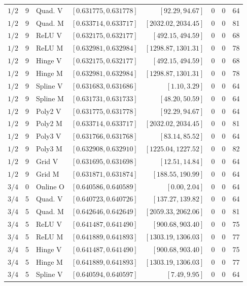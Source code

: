\begin{longtable}{rrlrrrrr}
$1/2$ & 9 & Quad. V & $[0.631775,0.631778]$ & $[92.29,94.67]$ & 0 & 0 & 64\\
$1/2$ & 9 & Quad. M & $[0.633714,0.633717]$ & $[2032.02,2034.45]$ & 0 & 0 & 81\\
$1/2$ & 9 & ReLU V & $[0.632175,0.632177]$ & $[492.15,494.59]$ & 0 & 0 & 68\\
$1/2$ & 9 & ReLU M & $[0.632981,0.632984]$ & $[1298.87,1301.31]$ & 0 & 0 & 78\\
$1/2$ & 9 & Hinge V & $[0.632175,0.632177]$ & $[492.15,494.59]$ & 0 & 0 & 68\\
$1/2$ & 9 & Hinge M & $[0.632981,0.632984]$ & $[1298.87,1301.31]$ & 0 & 0 & 78\\
$1/2$ & 9 & Spline V & $[0.631683,0.631686]$ & $[1.10,3.29]$ & 0 & 0 & 64\\
$1/2$ & 9 & Spline M & $[0.631731,0.631733]$ & $[48.20,50.59]$ & 0 & 0 & 64\\
$1/2$ & 9 & Poly2 V & $[0.631775,0.631778]$ & $[92.29,94.67]$ & 0 & 0 & 64\\
$1/2$ & 9 & Poly2 M & $[0.633714,0.633717]$ & $[2032.02,2034.45]$ & 0 & 0 & 81\\
$1/2$ & 9 & Poly3 V & $[0.631766,0.631768]$ & $[83.14,85.52]$ & 0 & 0 & 64\\
$1/2$ & 9 & Poly3 M & $[0.632908,0.632910]$ & $[1225.04,1227.52]$ & 0 & 0 & 82\\
$1/2$ & 9 & Grid V & $[0.631695,0.631698]$ & $[12.51,14.84]$ & 0 & 0 & 64\\
$1/2$ & 9 & Grid M & $[0.631871,0.631874]$ & $[188.55,190.99]$ & 0 & 0 & 64\\
$3/4$ & 0 & Online O & $[0.640586,0.640589]$ & $[0.00,2.04]$ & 0 & 0 & 64\\
$3/4$ & 5 & Quad. V & $[0.640723,0.640726]$ & $[137.27,139.82]$ & 0 & 0 & 64\\
$3/4$ & 5 & Quad. M & $[0.642646,0.642649]$ & $[2059.33,2062.06]$ & 0 & 0 & 81\\
$3/4$ & 5 & ReLU V & $[0.641487,0.641490]$ & $[900.68,903.40]$ & 0 & 0 & 75\\
$3/4$ & 5 & ReLU M & $[0.641889,0.641893]$ & $[1303.19,1306.03]$ & 0 & 0 & 77\\
$3/4$ & 5 & Hinge V & $[0.641487,0.641490]$ & $[900.68,903.40]$ & 0 & 0 & 75\\
$3/4$ & 5 & Hinge M & $[0.641889,0.641893]$ & $[1303.19,1306.03]$ & 0 & 0 & 77\\
$3/4$ & 5 & Spline V & $[0.640594,0.640597]$ & $[7.49,9.95]$ & 0 & 0 & 64\\

\end{longtable}
